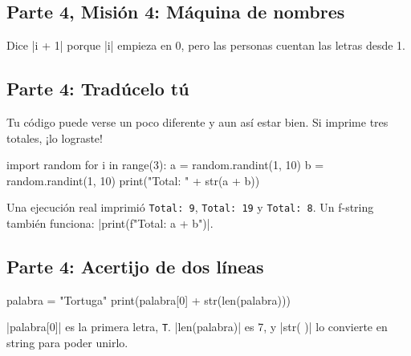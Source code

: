 \subsection*{Parte 4, Misión 4: Máquina de nombres}
Dice \py|i + 1| porque \py|i| empieza en 0, pero las personas cuentan las letras desde 1.

\subsection*{Parte 4: Tradúcelo tú}
Tu código puede verse un poco diferente y aun así estar bien. Si imprime tres totales, ¡lo lograste!
\begin{codenonum}
import random
for i in range(3):
    a = random.randint(1, 10)
    b = random.randint(1, 10)
    print("Total: " + str(a + b))
\end{codenonum}
Una ejecución real imprimió \texttt{Total: 9}, \texttt{Total: 19} y \texttt{Total: 8}. Un f-string también funciona: \py|print(f"Total: {a + b}")|.

\subsection*{Parte 4: Acertijo de dos líneas}
\begin{codenonum}
palabra = "Tortuga"
print(palabra[0] + str(len(palabra)))
\end{codenonum}
\py|palabra[0]| es la primera letra, \texttt{T}. \py|len(palabra)| es 7, y \py|str( )| lo convierte en string para poder unirlo.
